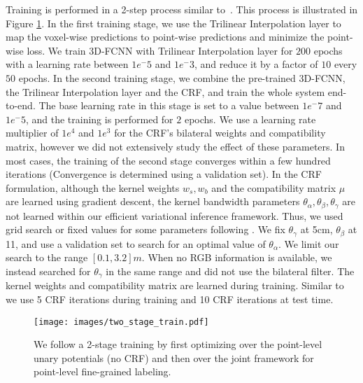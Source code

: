 \documentclass[10pt,twocolumn,letterpaper]{article}
\newcommand{\threedfcnn}[0]{3D-FCNN\xspace}
\newcommand{\crf}[0]{CRF\xspace}
\begin{document}
Training is performed in a 2-step process similar to~\cite{Zheng2015}. This process is illustrated in Figure \ref{fig:training_stages}. In the first training stage, we use the Trilinear Interpolation layer to map the voxel-wise predictions to point-wise predictions and minimize the point-wise loss. We train \threedfcnn with Trilinear Interpolation layer for $200$ epochs with a learning rate between $1e^-5$ and $1e^-3$, and reduce it by a factor of $10$ every $50$ epochs. In the second training stage, we combine the pre-trained \threedfcnn, the Trilinear Interpolation layer and the \crf, and train the whole system end-to-end. The base learning rate in this stage is set to a value between $1e^-7$ and $1e^-5$, and the training is performed for $2$ epochs. We use a learning rate multiplier of $1e^4$ and $1e^3$ for the \crf’s bilateral weights and compatibility matrix, however we did not extensively study the effect of these parameters. In most cases, the training of the second stage converges within a few hundred iterations (Convergence is determined using a validation set). In the CRF formulation, although the kernel weights $w_s, w_b$ and the compatibility matrix $\mu$ are learned using gradient descent, the kernel bandwidth parameters $\theta_\alpha, \theta_\beta, \theta_\gamma$ are not learned within our efficient variational inference framework. Thus, we used grid search or fixed values for some parameters following \cite{denseCRF}. We fix $\theta_\gamma$ at 5cm, $\theta_\beta$ at 11, and use a validation set to search for an optimal value of  $\theta_\alpha$. We limit our search to the range $[0.1, 3.2]m$. When no RGB information is available, we instead searched for $\theta_\gamma$  in the same range and did not use the bilateral filter. The kernel weights and compatibility matrix are learned during training. Similar to~\cite{Zheng2015} we use 5 CRF iterations during training and 10 CRF iterations at test time. 
\begin{figure}[t]
\centering
\texttt{[image: images/two\_stage\_train.pdf]}
\caption{\small{We follow a 2-stage training by first optimizing over the point-level unary potentials (no CRF) and then over the joint framework for point-level fine-grained labeling.}}
\label{fig:training_stages}
\vspace{-2mm}
\end{figure}
\end{document}
